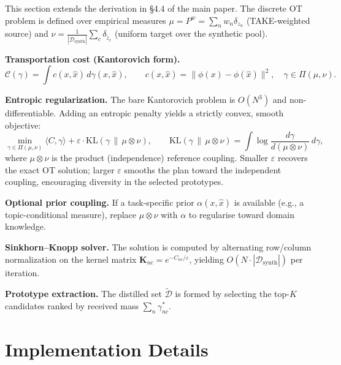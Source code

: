 This section extends the derivation in \S4.4 of the main paper.
The discrete OT problem is defined over empirical measures $\mu = P^w = \sum_n w_n \delta_{z_n}$ (TAKE-weighted source) and $\nu = \frac{1}{|\mathcal{D}_\text{synth}|}\sum_c \delta_{\tilde{z}_c}$ (uniform target over the synthetic pool).

\textbf{Transportation cost (Kantorovich form).}
\begin{equation}
    \mathcal{C}(\gamma)
    = \int c(x,\hat{x})\,d\gamma(x,\hat{x}),
    \qquad c(x,\hat{x}) = \|\phi(x) - \phi(\hat{x})\|^2,
    \quad \gamma \in \Pi(\mu,\nu).
\end{equation}

\textbf{Entropic regularization.}
The bare Kantorovich problem is $O(N^3)$ and non-differentiable.
Adding an entropic penalty yields a strictly convex, smooth objective:
\begin{equation}
    \min_{\gamma \in \Pi(\mu,\nu)}
    \langle C, \gamma \rangle
    + \varepsilon \cdot \mathrm{KL}(\gamma \,\|\, \mu \otimes \nu),
    \qquad
    \mathrm{KL}(\gamma \,\|\, \mu \otimes \nu)
    = \int \log\frac{d\gamma}{d(\mu \otimes \nu)}\,d\gamma,
\end{equation}
where $\mu \otimes \nu$ is the product (independence) reference coupling.
Smaller $\varepsilon$ recovers the exact OT solution; larger $\varepsilon$ smooths the plan toward the independent coupling, encouraging diversity in the selected prototypes.

\textbf{Optional prior coupling.}
If a task-specific prior $\alpha(x,\hat{x})$ is available (e.g., a topic-conditional measure), replace $\mu \otimes \nu$ with $\alpha$ to regularise toward domain knowledge.

\textbf{Sinkhorn--Knopp solver.}
The solution is computed by alternating row/column normalization on the kernel matrix $\mathbf{K}_{nc} = e^{-C_{nc}/\varepsilon}$, yielding $O(N \cdot |\mathcal{D}_\text{synth}|)$ per iteration.

\textbf{Prototype extraction.}
The distilled set $\tilde{\mathcal{D}}$ is formed by selecting the top-$K$ candidates ranked by received mass $\sum_n \gamma^*_{nc}$.


\section{Implementation Details}
\label{ch5:app:expts}

